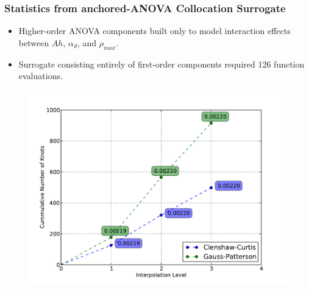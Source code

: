 \documentclass{beamer}
\begin{document}
\begin{frame}
\frametitle{Statistics from anchored-ANOVA Collocation Surrogate}

\begin{itemize}
  \item Higher-order ANOVA components built only to model interaction effects between $Ah$, $\alpha_d$, and $\rho_{max}$. 
  \item Surrogate consisting entirely of first-order components required 126 function evaluations. 
\end{itemize}

\begin{figure}
  \includegraphics[width=.63\textwidth]{./pk_sparse_grid_numknots.pdf}
\end{figure}

\end{frame}
\end{document}
